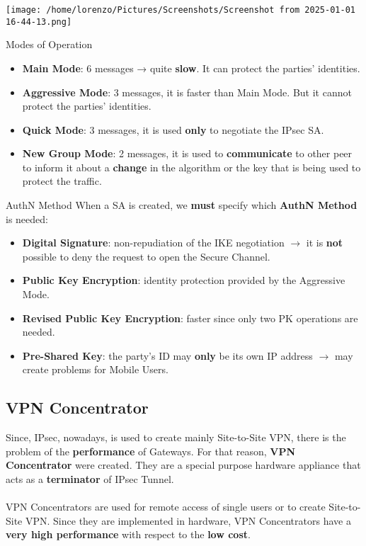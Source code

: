 \begin{itemize}
\begin{minipage}{0.4\textwidth}
        \texttt{[image: /home/lorenzo/Pictures/Screenshots/Screenshot from 2025-01-01 16-44-13.png]}
    \end{minipage}
   \begin{quotebox-yellow}{Modes of Operation}
   \begin{itemize}
    \item \textbf{Main Mode}: 6 messages → quite \textbf{slow}. It can protect the parties’ identities.
    \item \textbf{Aggressive Mode}: 3 messages, it is faster than Main Mode. But it cannot protect the parties’ identities.
    \item \textbf{Quick Mode}: 3 messages, it is used \textbf{only} to negotiate the IPsec SA.
    \item \textbf{New Group Mode}: 2 messages, it is used to \textbf{communicate} to other peer to inform it about a \textbf{change} in the algorithm or the key that is being used to protect the traffic.
   \end{itemize}
   \end{quotebox-yellow}
   \begin{quotebox-grey}{AuthN Method}
     When a SA is created, we \textbf{must} specify which \textbf{AuthN Method} is needed:
     \begin{itemize}
        \item \textbf{Digital Signature}: non-repudiation of the IKE negotiation \(\rightarrow \) it is \textbf{not} possible to deny the request to open the Secure Channel.
        \item \textbf{Public Key Encryption}: identity protection provided by the Aggressive Mode.
        \item \textbf{Revised Public Key Encryption}: faster since only two PK operations are needed.
        \item \textbf{Pre-Shared Key}: the party’s ID may \textbf{only} be its own IP address \(\rightarrow \) may create problems for Mobile Users.
     \end{itemize}
   \end{quotebox-grey}
\end{itemize}

\subsection{VPN Concentrator}
Since, IPsec, nowadays, is used to create mainly Site-to-Site VPN, there is the problem of the \textbf{performance} of Gateways. For that reason, \textbf{VPN Concentrator} were created. They are a
special purpose hardware appliance that acts as a \textbf{terminator} of IPsec Tunnel.\\   \\
VPN Concentrators are used for remote access of single users or to create Site-to-Site VPN.
Since they are implemented in hardware, VPN Concentrators have a \textbf{very high performance}
with respect to the \textbf{low cost}.

